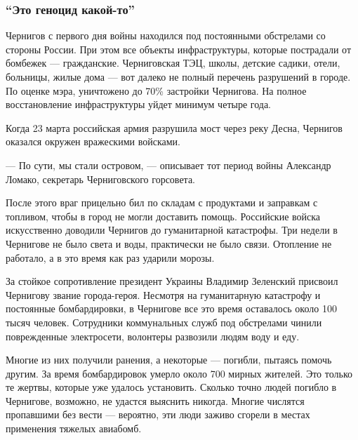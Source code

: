  
 
 
 
 

\subsubsection{\enquote{Это геноцид какой-то}}

Чернигов с первого дня войны находился под постоянными обстрелами со стороны
России. При этом все объекты инфраструктуры, которые пострадали от бомбежек —
гражданские. Черниговская ТЭЦ, школы, детские садики, отели, больницы, жилые
дома — вот далеко не полный перечень разрушений в городе. По оценке мэра,
уничтожено до 70\% застройки Чернигова. На полное восстановление инфраструктуры
уйдет минимум четыре года. 

Когда 23 марта российская армия разрушила мост через реку Десна, Чернигов
оказался окружен вражескими войсками. 

— По сути, мы стали островом, — описывает тот период войны Александр Ломако,
секретарь Черниговского горсовета.

После этого враг прицельно бил по складам с продуктами и заправкам с топливом,
чтобы в город не могли доставить помощь. Российские войска искусственно
доводили Чернигов до гуманитарной катастрофы. Три недели в Чернигове не было
света и воды, практически не было связи. Отопление не работало, а в это время
как раз ударили морозы. 

За стойкое сопротивление президент Украины Владимир Зеленский присвоил
Чернигову звание города-героя. Несмотря на гуманитарную катастрофу и постоянные
бомбардировки, в Чернигове все это время оставалось около 100 тысяч человек.
Сотрудники коммунальных служб под обстрелами чинили поврежденные электросети,
волонтеры развозили людям воду и еду. 

Многие из них получили ранения, а некоторые — погибли, пытаясь помочь другим.
За время бомбардировок умерло около 700 мирных жителей. Это только те жертвы,
которые уже удалось установить. Сколько точно людей погибло в Чернигове,
возможно, не удастся выяснить никогда. Многие числятся пропавшими без вести —
вероятно, эти люди заживо сгорели в местах применения тяжелых авиабомб.

